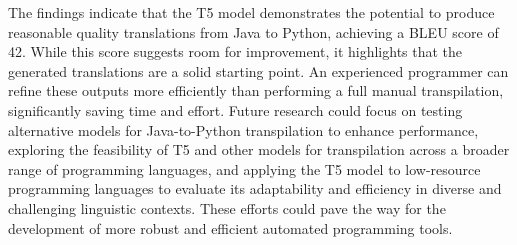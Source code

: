 \documentclass{dhbenelux}
\begin{document}
The findings indicate that the T5 model demonstrates the potential to produce reasonable quality translations from Java to Python, achieving a BLEU score of 42. While this score suggests room for improvement, it highlights that the generated translations are a solid starting point. An experienced programmer can refine these outputs more efficiently than performing a full manual transpilation, significantly saving time and effort. Future research could focus on testing alternative models for Java-to-Python transpilation to enhance performance, exploring the feasibility of T5 and other models for transpilation across a broader range of programming languages, and applying the T5 model to low-resource programming languages to evaluate its adaptability and efficiency in diverse and challenging linguistic contexts. These efforts could pave the way for the development of more robust and efficient automated programming tools.
\end{document}
